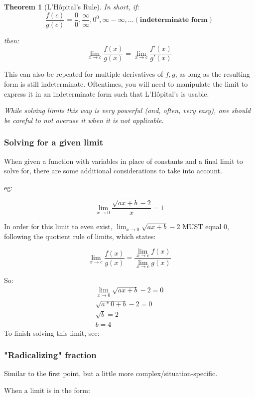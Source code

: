 \documentclass[12pt]{article}
\newtheorem*{theorem}{Theorem}
\begin{document}
\begin{theorem}[L'Hôpital's Rule]
In short, if:
$$\frac{f(c)}{g(c)} = \frac{0}{0}, \frac{\infty}{\infty}, 0^0, \infty - \infty, ... (\textbf{indeterminate form})$$ 

then:
$$\lim_{x\to c}\frac{f(x)}{g(x)} = \lim_{x\to c}\frac{f'(x)}{g'(x)}$$
\end{theorem}
This can also be repeated for multiple derivatives of $f, g$, as long as the resulting form is still indeterminate. Oftentimes, you will need to manipulate the limit to express it in an indeterminate form such that L'Hôpital's is usable.

\textit{While solving limits this way is very powerful (and, often, very easy), one should be careful to not overuse it when it is not applicable.}

\subsubsection{Solving for a given limit}

When given a function with variables in place of constants and a final limit to solve for, there are some additional considerations to take into account.

eg:

$$\lim_{x\to0}\frac{\sqrt{ax + b} - 2}{x} = 1$$

In order for this limit to even exist, $\lim_{x\to0} \sqrt{ax + b} - 2$ MUST equal 0, following the quotient rule of limits, which states:

$$\lim_{x\to c} \frac{f(x)}{g(x)} = \frac{\lim_{x\to c} f(x)}{\lim_{x\to c} g(x)}$$

So:
\begin{equation}
\begin{split}
    \lim_{x\to0} \sqrt{ax + b} - 2 = 0\\
    \sqrt{a*0 + b} - 2 = 0\\
    \sqrt{b} = 2\\
    b = 4
\end{split}
\end{equation}
To finish solving this limit, see:

\subsubsection{"Radicalizing" fraction}

Similar to the first point, but a little more complex/situation-specific.

When a limit is in the form:
\end{document}
